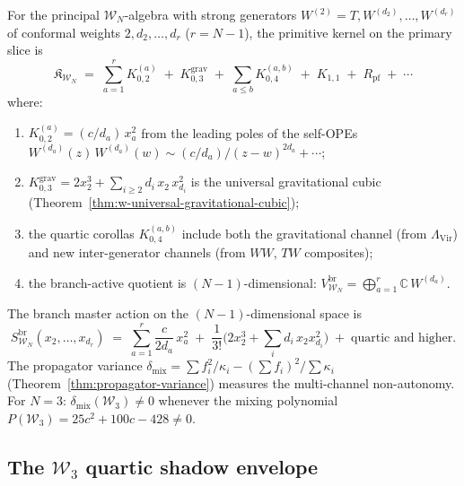 \begin{computation}
\label{comp:wn-primitive-kernel}
For the principal $\mathcal{W}_N$-algebra with strong generators
$W^{(2)} = T, W^{(d_2)}, \ldots, W^{(d_r)}$ of conformal weights
$2, d_2, \ldots, d_r$ \textup{(}$r = N{-}1$\textup{)}, the
primitive kernel on the primary slice is
\begin{equation}\label{eq:wn-primitive-kernel}
\mathfrak{K}_{\mathcal{W}_N}
\;=\;
\sum_{a=1}^{r} K_{0,2}^{(a)}
\;+\;
K_{0,3}^{\mathrm{grav}}
\;+\;
\sum_{a \leq b} K_{0,4}^{(a,b)}
\;+\;
K_{1,1}
\;+\;
R_{\mathrm{pf}}
\;+\;\cdots
\end{equation}
where:
\begin{enumerate}[label=\textup{(\alph*)}]
\item $K_{0,2}^{(a)} = (c/d_a)\,x_a^2$ from the leading poles of
  the self-OPEs $W^{(d_a)}(z)\,W^{(d_a)}(w)
  \sim (c/d_a)/(z{-}w)^{2d_a} + \cdots$;
\item $K_{0,3}^{\mathrm{grav}}
  = 2x_2^3 + \sum_{i \geq 2} d_i\,x_2\,x_{d_i}^2$
  is the universal gravitational cubic
  \textup{(}Theorem~\textup{\ref{thm:w-universal-gravitational-cubic})};
\item the quartic corollas $K_{0,4}^{(a,b)}$ include both
  the gravitational channel \textup{(}from $\Lambda_{\mathrm{Vir}}$\textup{)}
  and new inter-generator channels
  \textup{(}from $WW$, $TW$ composites\textup{)};
\item the branch-active quotient is $(N{-}1)$-dimensional:
  $V_{\mathcal{W}_N}^{\mathrm{br}}
  = \bigoplus_{a=1}^{r} \mathbb{C}\,W^{(d_a)}$.
\end{enumerate}
The branch master action on the $(N{-}1)$-dimensional space is
\begin{equation}\label{eq:wn-branch-action}
S_{\mathcal{W}_N}^{\mathrm{br}}(x_2, \ldots, x_{d_r})
\;=\;
\sum_{a=1}^{r} \frac{c}{2d_a}\,x_a^2
\;+\;
\frac{1}{3!}\bigl(2x_2^3 + {\textstyle\sum_{i}} d_i\,x_2 x_{d_i}^2\bigr)
\;+\;
\text{quartic and higher}.
\end{equation}
The propagator variance
$\delta_{\mathrm{mix}} = \sum f_i^2/\kappa_i - (\sum f_i)^2/\sum\kappa_i$
\textup{(}Theorem~\textup{\ref{thm:propagator-variance})} measures
the multi-channel non-autonomy.  For $N = 3$:
$\delta_{\mathrm{mix}}(\mathcal{W}_3) \neq 0$ whenever
the mixing polynomial $P(\mathcal{W}_3)
= 25c^2 + 100c - 428 \neq 0$.
\end{computation}

\subsection{The \texorpdfstring{$\mathcal{W}_3$}{W3} quartic shadow envelope}
\label{subsec:w-w3-quartic-shadow}

